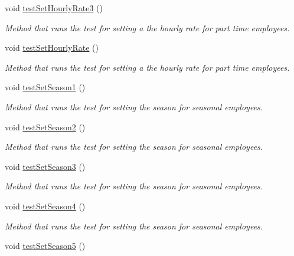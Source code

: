 \begin{DoxyCompactItemize}
void \hyperlink{class_all_employees_test_1_1_all_employees_tests_ab38208457ffcc2e53ea27d26799fd1ba}{test\+Set\+Hourly\+Rate3} ()
\begin{DoxyCompactList}\small\item\em Method that runs the test for setting a the hourly rate for part time employees. \end{DoxyCompactList}\item 
void \hyperlink{class_all_employees_test_1_1_all_employees_tests_a955231d6ba15137532445d4609009061}{test\+Set\+Hourly\+Rate} ()
\begin{DoxyCompactList}\small\item\em Method that runs the test for setting a the hourly rate for part time employees. \end{DoxyCompactList}\item 
void \hyperlink{class_all_employees_test_1_1_all_employees_tests_a636ea854bd018ff4aafc2801880c94b0}{test\+Set\+Season1} ()
\begin{DoxyCompactList}\small\item\em Method that runs the test for setting the season for seasonal employees. \end{DoxyCompactList}\item 
void \hyperlink{class_all_employees_test_1_1_all_employees_tests_a086f2b6a2b69d6a7b8534c561e9bdec9}{test\+Set\+Season2} ()
\begin{DoxyCompactList}\small\item\em Method that runs the test for setting the season for seasonal employees. \end{DoxyCompactList}\item 
void \hyperlink{class_all_employees_test_1_1_all_employees_tests_aab717e784d0d3015ab6992cb1189606d}{test\+Set\+Season3} ()
\begin{DoxyCompactList}\small\item\em Method that runs the test for setting the season for seasonal employees. \end{DoxyCompactList}\item 
void \hyperlink{class_all_employees_test_1_1_all_employees_tests_a9c69121831c62e9087bc9702e697e7ec}{test\+Set\+Season4} ()
\begin{DoxyCompactList}\small\item\em Method that runs the test for setting the season for seasonal employees. \end{DoxyCompactList}\item 
void \hyperlink{class_all_employees_test_1_1_all_employees_tests_a6379cb8ba21fab5a95a3255d8d432c06}{test\+Set\+Season5} ()

\end{DoxyCompactItemize}

